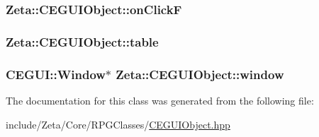\hypertarget{classZeta_1_1CEGUIObject_a75308bc9e27f88d7aafc0097ceec796d}{
\subsubsection[{on\+Click\+F}]{ Zeta\+::\+C\+E\+G\+U\+I\+Object\+::on\+Click\+F\hspace{0.3cm}{\ttfamily [private]}}}\label{classZeta_1_1CEGUIObject_a75308bc9e27f88d7aafc0097ceec796d}
\hypertarget{classZeta_1_1CEGUIObject_aea2af13d5b10dcf739073d39b3aaf206}{
\subsubsection[{table}]{ Zeta\+::\+C\+E\+G\+U\+I\+Object\+::table\hspace{0.3cm}{\ttfamily [private]}}}\label{classZeta_1_1CEGUIObject_aea2af13d5b10dcf739073d39b3aaf206}
\hypertarget{classZeta_1_1CEGUIObject_a3dcaa63869fa949e36cc765143571963}{
\subsubsection[{window}]{\setlength{\rightskip}{0pt plus 5cm}C\+E\+G\+U\+I\+::\+Window$\ast$ Zeta\+::\+C\+E\+G\+U\+I\+Object\+::window\hspace{0.3cm}{\ttfamily [private]}}}\label{classZeta_1_1CEGUIObject_a3dcaa63869fa949e36cc765143571963}


The documentation for this class was generated from the following file\+:\begin{DoxyCompactItemize}
\item 
include/\+Zeta/\+Core/\+R\+P\+G\+Classes/\hyperlink{CEGUIObject_8hpp}{C\+E\+G\+U\+I\+Object.\+hpp}\end{DoxyCompactItemize}

